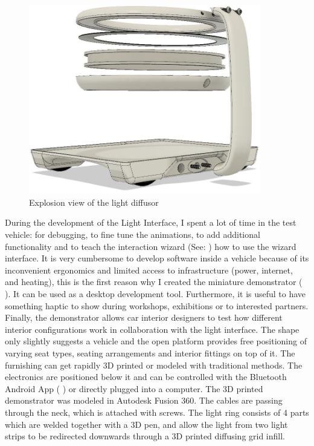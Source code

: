 \begin{figure}
\includegraphics[width=0.9\textwidth]{fig/explosion.JPG}
    \caption[Explosion-view Demonstrator]{Explosion view of the light diffusor}
    \label{fig:demonstratorExplosion}
\end{figure}
During the development of the Light Interface, I spent a lot of time in the test vehicle: for debugging, to fine tune the animations, to add additional functionality and to teach the interaction wizard (See: \emph{}) how to use the wizard interface. It is very cumbersome to develop software inside a vehicle because of its inconvenient ergonomics and limited access to infrastructure (power, internet, and heating), this is the first reason why I created the miniature demonstrator ( \emph{}). It can be used as a desktop development tool. Furthermore, it is useful to have something haptic to show during workshops, exhibitions or to interested partners. Finally, the demonstrator allows car interior designers to test how different interior configurations work in collaboration with the light interface. The shape only slightly suggests a vehicle and the open platform provides free positioning of varying seat types, seating arrangements and interior fittings on top of it. The furnishing can get rapidly 3D printed or modeled with traditional methods. The electronics are positioned below it and can be controlled with the Bluetooth Android App ( \emph{}) or directly plugged into a computer. The 3D printed demonstrator was modeled in Autodesk Fusion 360. The cables are passing through the neck, which is attached with screws. The light ring consists of 4 parts which are welded together with a 3D pen, and allow the light from two light strips to be redirected downwards through a 3D printed diffusing grid infill. 


